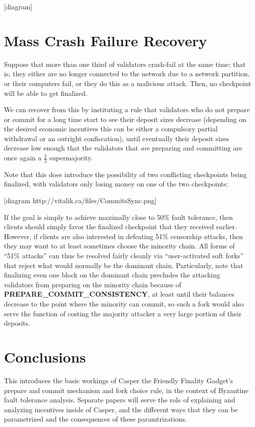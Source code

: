 \documentclass[12pt]{article}
\begin{document}
[diagram]

\section{Mass Crash Failure Recovery}

Suppose that more than one third of validators crash-fail at the same time; that is, they either are no longer connected to the network due to a network partition, or their computers fail, or they do this as a malicious attack. Then, no checkpoint will be able to get finalized.

We can recover from this by instituting a rule that validators who do not prepare or commit for a long time start to see their deposit sizes decrease (depending on the desired economic incentives this can be either a compulsory partial withdrawal or an outright confiscation), until eventually their deposit sizes decrease low enough that the validators that \textit{are} preparing and committing are once again a $\frac{2}{3}$ supermajority.

Note that this does introduce the possibility of two conflicting checkpoints being finalized, with validators only losing money on one of the two checkpoints:

[diagram http://vitalik.ca/files/CommitsSync.png]

If the goal is simply to achieve maximally close to 50\% fault tolerance, then clients should simply favor the finalized checkpoint that they received earlier. However, if clients are also interested in defeating 51\% censorship attacks, then they may want to at least sometimes choose the minority chain. All forms of ``51\% attacks'' can thus be resolved fairly cleanly via ``user-activated soft forks'' that reject what would normally be the dominant chain. Particularly, note that finalizing even one block on the dominant chain precludes the attacking validators from preparing on the minority chain because of \textbf{PREPARE\_COMMIT\_CONSISTENCY}, at least until their balances decrease to the point where the minority can commit, so such a fork would also serve the function of costing the majority attacker a very large portion of their deposits.

\section{Conclusions}

This introduces the basic workings of Casper the Friendly Finality Gadget's prepare and commit mechanism and fork choice rule, in the context of Byzantine fault tolerance analysis. Separate papers will serve the role of explaining and analyzing incentives inside of Casper, and the different ways that they can be parametrized and the consequences of these paramtrizations.
\end{document}
